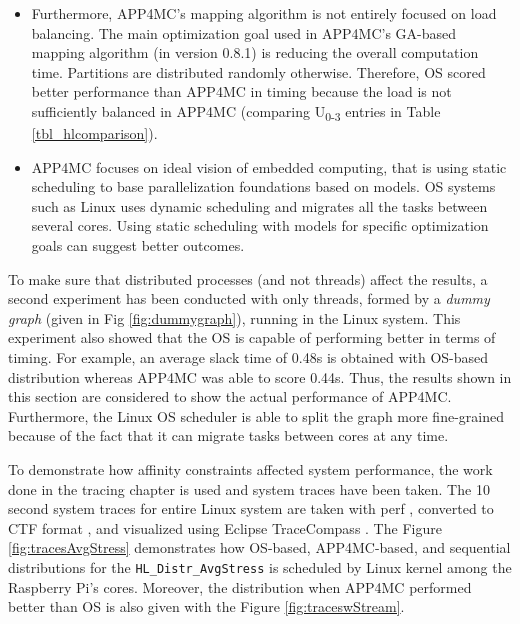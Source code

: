 \begin{itemize}
\begin{itemize}
		\item Furthermore, APP4MC's mapping algorithm is not entirely focused on load balancing. The main optimization goal used in APP4MC's GA-based mapping algorithm (in version 0.8.1) is reducing the overall computation time. Partitions are distributed randomly otherwise. Therefore, OS scored better performance than APP4MC in timing because the load is not sufficiently balanced in APP4MC (comparing U\textsubscript{0-3} entries in Table \ref{tbl_hlcomparison}).
		\item APP4MC focuses on ideal vision of embedded computing, that is using static scheduling to base parallelization foundations based on models. OS systems such as Linux uses dynamic scheduling and migrates all the tasks between several cores. Using static scheduling with models for specific optimization goals can suggest better outcomes.
	\end{itemize}
\end{itemize}

To make sure that distributed processes (and not threads) affect the results, a second experiment has been conducted with only threads, formed by a \textit{dummy graph} (given in Fig \ref{fig:dummygraph}), running in the Linux system. This experiment also showed that the OS is capable of performing better in terms of timing. For example, an average slack time of 0.48s is obtained with OS-based distribution whereas APP4MC was able to score 0.44s. Thus, the results shown in this section are considered to show the actual performance of APP4MC. Furthermore, the Linux OS scheduler is able to split the graph more fine-grained because of the fact that it can migrate tasks between cores at any time. 

To demonstrate how affinity constraints affected system performance, the work done in the tracing chapter is used and system traces have been taken. The 10 second system traces for entire Linux system are taken with perf \cite{perf1}, converted to CTF format \cite{perfbabeltrace}, and visualized using Eclipse TraceCompass \cite{tracecompass}. The Figure \ref{fig:tracesAvgStress} demonstrates how OS-based, APP4MC-based, and sequential distributions for the \texttt{HL{\_}Distr{\_}AvgStress} is scheduled by Linux kernel among the Raspberry Pi's cores. Moreover, the distribution when APP4MC performed better than OS is also given with the Figure \ref{fig:traceswStream}.

